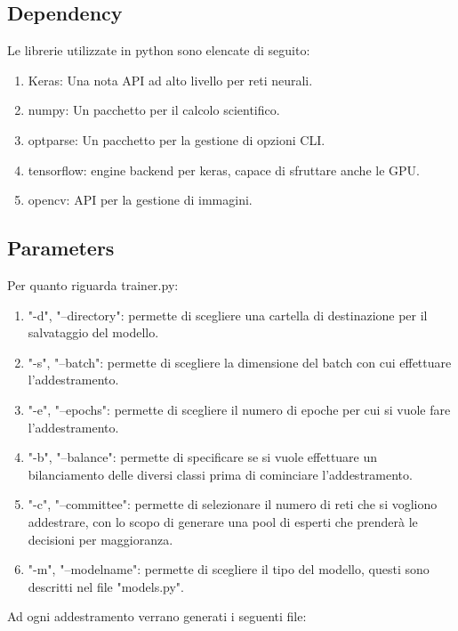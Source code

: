 \documentclass[12pt]{article}
\begin{document}

\subsection{Dependency}
Le librerie utilizzate in python sono elencate di seguito:
\begin{enumerate}
    \item Keras\cite{keras}: Una nota API ad alto livello per reti neurali.
    \item numpy: Un pacchetto per il calcolo scientifico.
    \item optparse: Un pacchetto per la gestione di opzioni CLI.
    \item tensorflow\cite{tensorflow}: engine backend per keras, capace di sfruttare anche le GPU.
    \item opencv\cite{opencv}: API per la gestione di immagini.
\end{enumerate}


\subsection{Parameters}
Per quanto riguarda trainer.py:
\begin{enumerate}
    \item "-d", "--directory": permette di scegliere una cartella di destinazione
    per il salvataggio del modello.
    \item "-s", "--batch": permette di scegliere la dimensione del batch con cui
    effettuare l'addestramento.
    \item "-e", "--epochs": permette di scegliere il numero di epoche per
    cui si vuole fare l'addestramento.
    \item "-b", "--balance": permette di specificare se si vuole effettuare
    un bilanciamento delle diversi classi prima di cominciare l'addestramento.
    \item "-c", "--committee": permette di selezionare il numero di reti che si 
    vogliono addestrare, con lo scopo di generare una pool di esperti che prenderà
    le decisioni per maggioranza.
    \item "-m", "--modelname": permette di scegliere il tipo del modello, questi
    sono descritti nel file "models.py".
\end{enumerate}
Ad ogni addestramento verrano generati i seguenti file:
\end{document}
